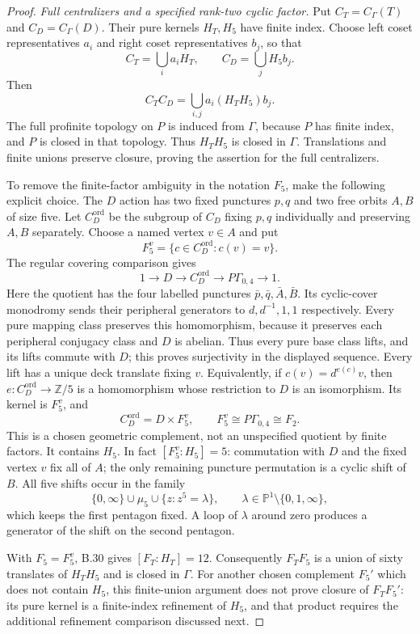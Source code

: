 \begin{proof}
\emph{Full centralizers and a specified rank-two cyclic factor.}
Put $C_T=C_\Gamma(T)$ and $C_D=C_\Gamma(D)$.
Their pure kernels $H_T,H_5$ have finite index.
Choose left coset representatives $a_i$ and right coset
representatives $b_j$, so that
\[
 C_T=\bigcup_i a_iH_T,\qquad C_D=\bigcup_j H_5b_j.
\]
Then
\[
 C_TC_D=\bigcup_{i,j}a_i(H_TH_5)b_j.
\]
The full profinite topology on $P$ is induced from
$\Gamma$, because $P$ has finite index, and $P$ is closed
in that topology.  Thus $H_TH_5$ is closed in $\Gamma$.
Translations and finite unions preserve closure, proving
the assertion for the full centralizers.

To remove the finite-factor ambiguity in the notation $F_5$,
make the following explicit choice.  The $D$ action has
two fixed punctures $p,q$ and two free orbits $A,B$ of size
five.  Let $C_D^{\mathrm{ord}}$ be the subgroup of $C_D$
fixing $p,q$ individually and preserving $A,B$ separately.
Choose a named vertex $v\in A$ and put
\[
 F_5^v=\{c\in C_D^{\mathrm{ord}}:c(v)=v\}.
\]
The regular covering comparison gives
\[
 1\longrightarrow D\longrightarrow C_D^{\mathrm{ord}}
 \longrightarrow P\Gamma_{0,4}\longrightarrow1.
\]
Here the quotient has the four labelled punctures
$\bar p,\bar q,\bar A,\bar B$.
Its cyclic-cover monodromy sends their peripheral
generators to $d,d^{-1},1,1$ respectively.
Every pure mapping class preserves this homomorphism,
because it preserves each peripheral conjugacy class
and $D$ is abelian.  Thus every pure base class lifts,
and its lifts commute with $D$; this proves surjectivity
in the displayed sequence.
Every lift has a unique deck translate fixing $v$.
Equivalently, if $c(v)=d^{e(c)}v$, then
$e:C_D^{\mathrm{ord}}\to\mathbb Z/5$ is a homomorphism
whose restriction to $D$ is an isomorphism.
Its kernel is $F_5^v$, and
\[
 C_D^{\mathrm{ord}}=D\times F_5^v,\qquad
 F_5^v\cong P\Gamma_{0,4}\cong F_2.
\]
This is a chosen geometric complement, not an unspecified
quotient by finite factors.
It contains $H_5$.  In fact $[F_5^v:H_5]=5$:
commutation with $D$ and the fixed vertex $v$ fix all
of $A$; the only remaining puncture permutation is a
cyclic shift of $B$.  All five shifts occur in the
family
\[
 \{0,\infty\}\cup\mu_5\cup
       \{z:z^5=\lambda\},\qquad
 \lambda\in\mathbb P^1\setminus\{0,1,\infty\},
\]
which keeps the first pentagon fixed.  A loop of
$\lambda$ around zero produces a generator of the
shift on the second pentagon.

With $F_5=F_5^v$, B.30 gives
$[F_T:H_T]=12$.
Consequently $F_TF_5$ is a union of sixty translates
of $H_TH_5$ and is closed in $\Gamma$.
For another chosen complement $F_5'$ which does not
contain $H_5$, this finite-union argument does not prove
closure of $F_TF_5'$: its pure kernel is a finite-index
refinement of $H_5$, and that product requires the
additional refinement comparison discussed next.
\end{proof}


